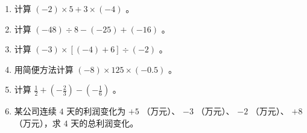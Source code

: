 \begin{practice}


\begin{enumerate}
  \item 计算 $(-2) \times 5 + 3 \times (-4)$ 。
  \item 计算 $(-48) \div 8 - (-25) + (-16)$ 。
  \item 计算 $(-3) \times [(-4) + 6] \div (-2)$ 。
  \item 用简便方法计算 $(-8) \times 125 \times (-0.5)$ 。
  \item 计算 $\frac{1}{2} + \left(-\frac{2}{3}\right) - \left(-\frac{1}{6}\right)$ 。
  \item 某公司连续 $4$ 天的利润变化为 $+5$ （万元）、 $-3$ （万元）、 $-2$ （万元）、 $+8$ （万元），求 $4$ 天的总利润变化。
\end{enumerate}


\end{practice}



